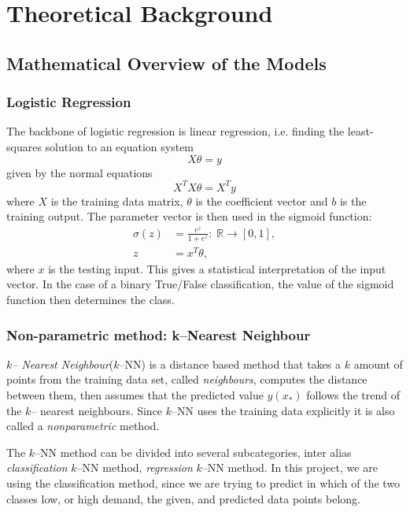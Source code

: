 \section{Theoretical Background}


\subsection{Mathematical Overview of the Models}
\subsubsection{Logistic Regression}
The backbone of logistic regression is linear regression, i.e. finding the least-squares solution to an equation system \begin{equation}
    X\theta = y
\end{equation}
given by the normal equations \begin{equation}
    X^TX \theta = X^Ty
\end{equation}
where $X$ is the training data matrix, $\theta$ is the coefficient vector and $b$ is the training output. The parameter vector is then used in the sigmoid function: \begin{align}
    \sigma(z) &= \frac{e^{z}}{1+e^{z}}: \; \mathbb{R}\to [0,1],\\
    z &= x^T \theta,
\end{align}
where $x$ is the testing input. This gives a statistical interpretation of the input vector. In the case of a binary True/False classification, the value of the sigmoid function then determines the class.

    \subsubsection{Non-parametric method: k--Nearest Neighbour}
        \emph{$k$-- Nearest Neighbour}($k$--NN) is a distance based method that takes a $k$ amount of points from the training data set, called \emph{neighbours}, computes the distance between them, then assumes that the predicted value $\hat{y}(x_{*})$ follows the trend of the $k$-- nearest neighbours. Since $k$--NN uses the training data explicitly it is also called a \emph{nonparametric} method.
    
        The $k$--NN method can be divided into several subcategories, inter alias \emph{classification} $k$--NN method, \emph{regression}  $k$--NN method. In this project, we are using the classification method, since we are trying to predict in which of the two classes low, or high demand, the given, and predicted data points belong.
    
